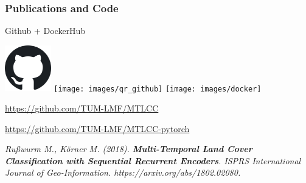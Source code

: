 
%
%
%



\begin{frame}[c]
\frametitle{Publications and Code}
\centering 

\Large



Github + DockerHub

\vspace{1ex}

\includegraphics[width=2cm]{images/github} \hspace{.5ex}
\texttt{[image: images/qr\_github]} \hspace{.5ex}
\texttt{[image: images/docker]}

\vspace{1ex}

\url{https://github.com/TUM-LMF/MTLCC}

\url{https://github.com/TUM-LMF/MTLCC-pytorch}

\vspace{1em}
\small
\textsl{
	Rußwurm M., Körner M. (2018). \textbf{Multi-Temporal Land Cover Classification with Sequential Recurrent Encoders}. ISPRS International Journal of Geo-Information. https://arxiv.org/abs/1802.02080.
}
	
\end{frame}


